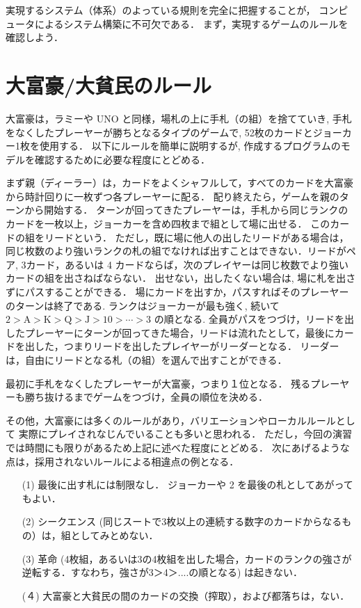 実現するシステム（体系）のよっている規則を完全に把握することが，
コンピュータによるシステム構築に不可欠である．
まず，実現するゲームのルールを確認しよう．

\section{大富豪/大貧民のルール}

大富豪は，ラミーや UNO と同様，場札の上に手札（の組）を捨てていき, 手札をなくしたプレーヤーが勝ちとなるタイプのゲームで, 52枚のカードとジョーカー1枚を使用する．
以下にルールを簡単に説明するが, 作成するプログラムのモデルを確認するために必要な程度にとどめる．  

まず親（ディーラー）は，カードをよくシャフルして，すべてのカードを大富豪から時計回りに一枚ずつ各プレーヤーに配る．
配り終えたら，ゲームを親のターンから開始する．
ターンが回ってきたプレーヤーは，手札から同じランクのカードを一枚以上，ジョーカーを含め四枚まで組として場に出せる．
このカードの組をリードという．
ただし，既に場に他人の出したリードがある場合は，同じ枚数のより強いランクの札の組でなければ出すことはできない．リードがペア, 3カード，あるいは 4 カードならば，次のプレイヤーは同じ枚数でより強いカードの組を出さねばならない．
出せない，出したくない場合は, 場に札を出さずにパスすることができる．
場にカードを出すか，パスすればそのプレーヤーのターンは終了である. 
ランクはジョーカーが最も強く, 続いて $2 > \mathrm{A} > \mathrm{K} > \mathrm{Q} > \mathrm{J} > 10 > \cdots > 3$ の順となる. 
全員がパスをつづけ，リードを出したプレーヤーにターンが回ってきた場合，リードは流れたとして，最後にカードを出した，つまりリードを出したプレイヤーがリーダーとなる．
リーダーは，自由にリードとなる札（の組）を選んで出すことができる．

最初に手札をなくしたプレーヤーが大富豪，つまり１位となる．
残るプレーヤーも勝ち抜けるまでゲームをつづけ，全員の順位を決める．

その他，大富豪には多くのルールがあり，バリエーションやローカルルールとして
実際にプレイされなじんでいることも多いと思われる．
ただし，今回の演習では時間にも限りがあるため上記に述べた程度にとどめる．
次にあげるような点は，採用されないルールによる相違点の例となる．
\begin{enumerate}
\item[(1)] 最後に出す札には制限なし．
ジョーカーや 2 を最後の札としてあがってもよい．
\item[(2)] シークエンス (同じスートで3枚以上の連続する数字のカードからなるもの）は，組としてみとめない．
\item[(3)] 革命 (4枚組，あるいは3の4枚組を出した場合，カードのランクの強さが逆転する．すなわち，強さが3＞4＞....の順となる) は起きない．
\item[(４)] 大富豪と大貧民の間のカードの交換（搾取），および都落ちは，ない．
\end{enumerate}

